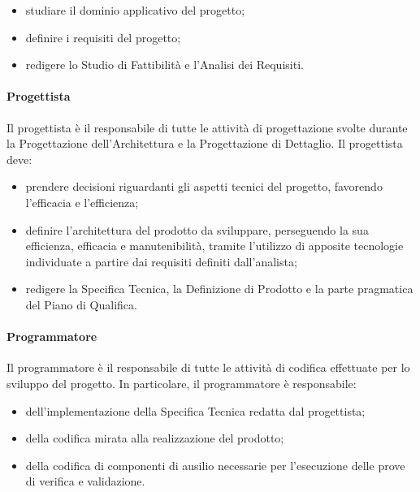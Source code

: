 			\begin{itemize}
				\item studiare il dominio applicativo del progetto;
				\item definire i requisiti del progetto;
				\item redigere lo Studio di Fattibilità e l'Analisi dei Requisiti.
			\end{itemize}

		\paragraph{Progettista}

			Il progettista è il responsabile di tutte le attività di progettazione svolte durante la Progettazione dell'Architettura e la Progettazione di Dettaglio.
			\newline
			Il progettista deve:

			\begin{itemize}
				\item prendere decisioni riguardanti gli aspetti tecnici del progetto, favorendo l'efficacia e l'efficienza;
				\item definire l'architettura del prodotto da sviluppare, perseguendo la sua efficienza, efficacia e manutenibilità, tramite l'utilizzo di apposite tecnologie individuate a partire dai requisiti definiti dall'analista;
				\item redigere la Specifica Tecnica, la Definizione di Prodotto e la parte pragmatica del Piano di Qualifica.
			\end{itemize}

		\paragraph{Programmatore}

			Il programmatore è il responsabile di tutte le attività di codifica effettuate per lo sviluppo del progetto.
			\newline
			In particolare, il programmatore è responsabile:

			\begin{itemize}
				\item dell'implementazione della Specifica Tecnica redatta dal progettista;
				\item della codifica mirata alla realizzazione del prodotto;
				\item della codifica di componenti di ausilio necessarie per l'esecuzione delle prove di verifica e validazione.
			\end{itemize}


